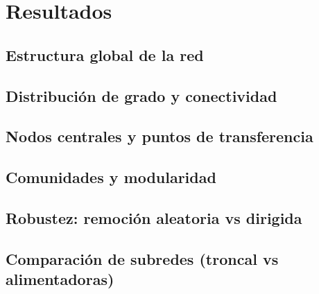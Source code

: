 \chapter{Resultados}
    \section{Estructura global de la red}
    \section{Distribución de grado y conectividad}
    \section{Nodos centrales y puntos de transferencia}
    \section{Comunidades y modularidad}
    \section{Robustez: remoción aleatoria vs dirigida}
    \section{Comparación de subredes (troncal vs alimentadoras)}
